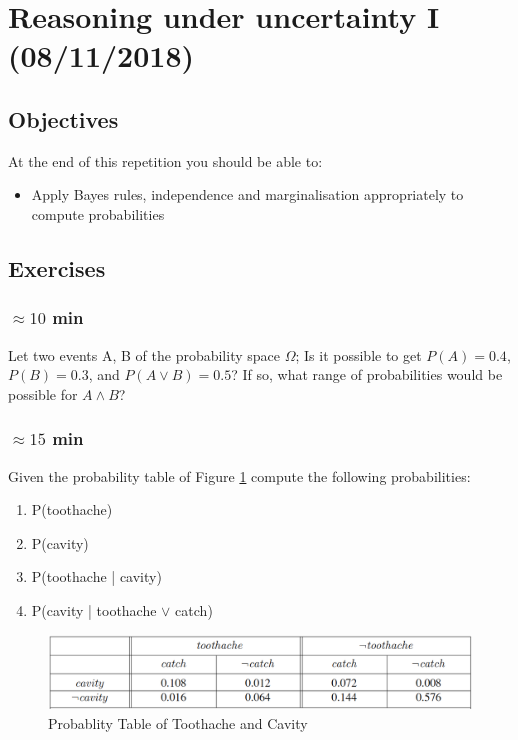 \documentclass[a4paper, 10pt]{article}
\begin{document}


   \setcounter{page}{1}
   \section{Reasoning under uncertainty I (08/11/2018)}
   \subsection{Objectives}
      At the end of this repetition you should be able to:
      \begin{itemize}
          \item Apply Bayes rules, independence and marginalisation appropriately to compute probabilities
      \end{itemize}
\subsection{Exercises}
   \subsubsection{$\approx 10$ min}
   Let two events A, B of the probability space $\Omega$; Is it possible to get $P(A)=0.4$, $P(B)=0.3$, and
    $P(A\vee B)=0.5$? If so, what range of probabilities would be possible for $A\wedge B$?
    \subsubsection{$\approx 15$ min}
    Given the probability table of Figure \ref{fig:p_table} compute the following probabilities:
    \begin{enumerate}
        \item P(toothache)
        \item P(cavity)
        \item P(toothache | cavity)
        \item P(cavity | toothache $\vee$ catch)
    \end{enumerate}
    \begin{figure}[H]
        \centering
        \includegraphics[width=1.\textwidth]{figures/proba_table.png}
        \caption{Probablity Table of Toothache and Cavity}
        \label{fig:p_table}
    \end{figure}
\end{document}
